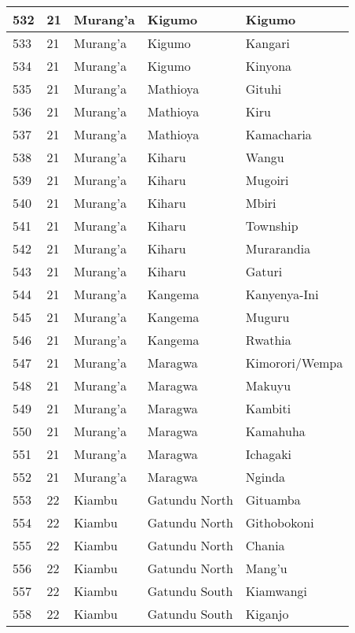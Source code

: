 \begin{table}[!ht]
\begin{tabular}{|l|l|l|l|l|}
        532 & 21 & Murang’a & Kigumo & Kigumo \\ \hline
        533 & 21 & Murang’a & Kigumo & Kangari \\ \hline
        534 & 21 & Murang’a & Kigumo & Kinyona \\ \hline
        535 & 21 & Murang’a & Mathioya & Gituhi \\ \hline
        536 & 21 & Murang’a & Mathioya & Kiru \\ \hline
        537 & 21 & Murang’a & Mathioya & Kamacharia \\ \hline
        538 & 21 & Murang’a & Kiharu & Wangu \\ \hline
        539 & 21 & Murang’a & Kiharu & Mugoiri \\ \hline
        540 & 21 & Murang’a & Kiharu & Mbiri \\ \hline
        541 & 21 & Murang’a & Kiharu & Township \\ \hline
        542 & 21 & Murang’a & Kiharu & Murarandia \\ \hline
        543 & 21 & Murang’a & Kiharu & Gaturi \\ \hline
        544 & 21 & Murang’a & Kangema & Kanyenya-Ini \\ \hline
        545 & 21 & Murang’a & Kangema & Muguru \\ \hline
        546 & 21 & Murang’a & Kangema & Rwathia \\ \hline
        547 & 21 & Murang’a & Maragwa & Kimorori/Wempa \\ \hline
        548 & 21 & Murang’a & Maragwa & Makuyu \\ \hline
        549 & 21 & Murang’a & Maragwa & Kambiti \\ \hline
        550 & 21 & Murang’a & Maragwa & Kamahuha \\ \hline
        551 & 21 & Murang’a & Maragwa & Ichagaki \\ \hline
        552 & 21 & Murang’a & Maragwa & Nginda \\ \hline
        553 & 22 & Kiambu & Gatundu North & Gituamba \\ \hline
        554 & 22 & Kiambu & Gatundu North & Githobokoni \\ \hline
        555 & 22 & Kiambu & Gatundu North & Chania \\ \hline
        556 & 22 & Kiambu & Gatundu North & Mang’u \\ \hline
        557 & 22 & Kiambu & Gatundu South & Kiamwangi \\ \hline
        558 & 22 & Kiambu & Gatundu South & Kiganjo \\ \hline

\end{tabular}
\end{table}
